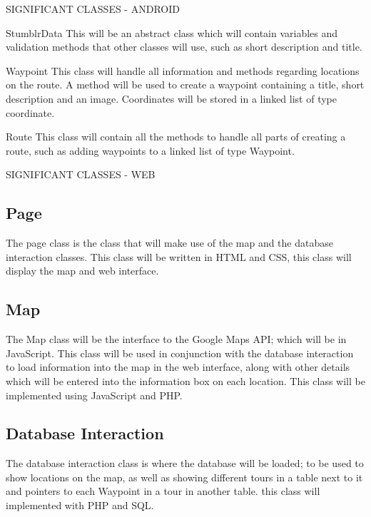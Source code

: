 \documentclass{article}
\begin{document}
	\clearpage
	\begin{section}{SIGNIFICANT CLASSES - ANDROID}
		\begin{subsection}{StumblrData}
		This will be an abstract class which will contain variables and validation methods that other classes will use, such as short description and title.
		\end{subsection}

		\begin{subsection}{Waypoint}
		This class will handle all information and methods regarding locations on the route. A method will be used to create a waypoint containing a title, short description and an image. Coordinates will be stored in a linked list of type coordinate.
		\end{subsection}

		\begin{subsection}{Route}
		This class will contain all the methods to handle all parts of creating a route, such as adding waypoints to a linked list of type Waypoint. 
		\end{subsection}
	\end{section}
	
	\begin{section}{SIGNIFICANT CLASSES - WEB}
		\subsection{Page}
		The page class is the class that will make use of the map and the database interaction classes. This class will be written in HTML and CSS, this class will display the map and web interface.

		\subsection{Map}
		The Map class will be the interface to the Google Maps API; which will be in JavaScript. This class will be used in conjunction with the database interaction to load information into the map in the web interface, along with other details which will be entered into the information box on each location. This class will be implemented using JavaScript and PHP.

		\subsection{Database Interaction}
		The database interaction class is where the database will be loaded; to be used to show locations on the map, as well as showing different tours in a table next to it and pointers to each Waypoint in a tour in another table. this class will implemented with PHP and SQL.
	\end{section}
	
\end{document}
